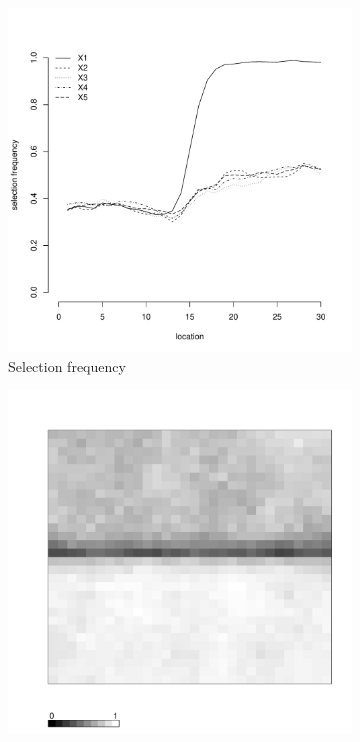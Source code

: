 \documentclass[authoryear, review, 11pt]{elsarticle}
\begin{document}
\begin{figure}
\begin{subfigure}[b]{0.45\textwidth}
		\includegraphics[width=\textwidth]{../../figures/simulation/15.3.profile_selection.pdf}
		\caption{Selection frequency}
	\end{subfigure}
	\begin{subfigure}[b]{0.45\textwidth}
	\centering
		\includegraphics[width=\textwidth]{../../figures/simulation/X1.15.3.unshrunk_bootstrap_coverage.pdf}

\end{subfigure}
\end{figure}
\end{document}
